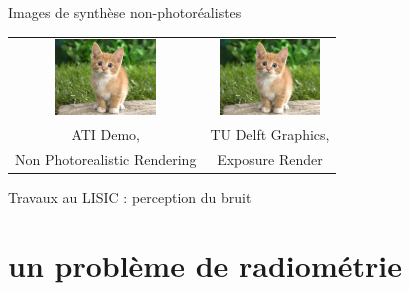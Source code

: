 \documentclass[10pt]{beamer}
\begin{document}
\begin{frame}{\large \insertsection}
    \begin{block}{Images de synthèse non-photoréalistes}
        \begin{center}
            \begin{tabular}{c c}
                \includegraphics[height=2cm]{images/chaton.jpg}
                &
                \includegraphics[height=2cm]{images/chaton.jpg}
                \\ 
                ATI Demo, 
                &
                TU Delft Graphics, 
                \\
                Non Photorealistic Rendering
                &
                Exposure Render 
            \end{tabular}
        \end{center}
    \end{block} 
\end{frame}

\begin{frame}{\large \insertsection}
    \begin{block}{Travaux au LISIC : perception du bruit}
        \centering
    \end{block} 
\end{frame}


\section{un problème de radiométrie}
\end{document}

